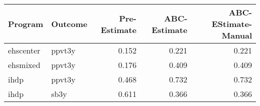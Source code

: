 \begin{table}[ht]
\centering
\begin{tabular}{llrrr}
  \hline
Program & Outcome & Pre-Estimate & ABC-Estimate & ABC-EStimate-Manual \\ 
  \hline
ehscenter & ppvt3y & 0.152 & 0.221 & 0.221 \\ 
  ehsmixed & ppvt3y & 0.176 & 0.409 & 0.409 \\ 
  ihdp & ppvt3y & 0.468 & 0.732 & 0.732 \\ 
  ihdp & sb3y & 0.611 & 0.366 & 0.366 \\ 
   \hline
\end{tabular}
\end{table}
